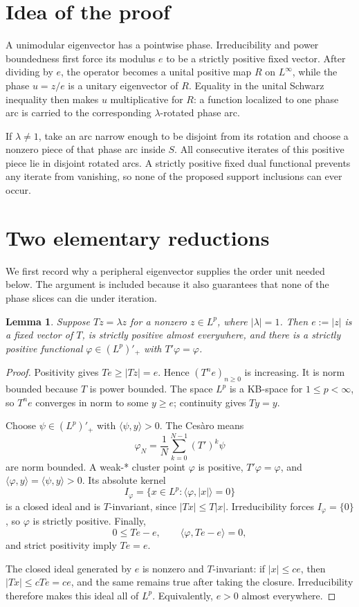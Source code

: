 \documentclass[11pt]{article}
\newtheorem{lemma}[theorem]{Lemma}
\begin{document}
\section{Idea of the proof}

A unimodular eigenvector has a pointwise phase.  Irreducibility and power
boundedness first force its modulus $e$ to be a strictly positive fixed
vector.  After dividing by $e$, the operator becomes a unital positive map
$R$ on $L^\infty$, while the phase $u=z/e$ is a unitary eigenvector of $R$.
Equality in the unital Schwarz inequality then makes $u$ multiplicative for
$R$: a function localized to one phase arc is carried to the corresponding
$\lambda$-rotated phase arc.

If $\lambda\ne1$, take an arc narrow enough to be disjoint from its rotation
and choose a nonzero piece of that phase arc inside $S$.  All consecutive
iterates of this positive piece lie in disjoint rotated arcs.  A strictly
positive fixed dual functional prevents any iterate from vanishing, so none
of the proposed support inclusions can ever occur.

\section{Two elementary reductions}

We first record why a peripheral eigenvector supplies the order unit needed
below.  The argument is included because it also guarantees that none of the
phase slices can die under iteration.

\begin{lemma}\label{lem:fixed-modulus}
Suppose $Tz=\lambda z$ for a nonzero $z\in L^p$, where
$|\lambda|=1$.  Then $e:=|z|$ is a fixed vector of $T$, is strictly positive
almost everywhere, and there is a strictly positive functional
$\varphi\in(L^p)'_+$ with $T'\varphi=\varphi$.
\end{lemma}

\begin{proof}
Positivity gives $Te\ge |Tz|=e$.  Hence $(T^ne)_{n\ge0}$ is increasing.
It is norm bounded because $T$ is power bounded.  The space $L^p$ is a
KB-space for $1\le p<\infty$, so $T^ne$ converges in norm to some $y\ge e$;
continuity gives $Ty=y$.

Choose $\psi\in(L^p)'_+$ with $\langle\psi,y\rangle>0$.  The Ces\`aro means
\[
 \varphi_N=\frac1N\sum_{k=0}^{N-1}(T')^k\psi
\]
are norm bounded.  A weak-* cluster point $\varphi$ is positive,
$T'\varphi=\varphi$, and
$\langle\varphi,y\rangle=\langle\psi,y\rangle>0$.  Its absolute kernel
\[
 I_\varphi=\{x\in L^p:\langle\varphi,|x|\rangle=0\}
\]
is a closed ideal and is $T$-invariant, since
$|Tx|\le T|x|$.  Irreducibility forces $I_\varphi=\{0\}$, so $\varphi$ is
strictly positive.  Finally,
\[
 0\le Te-e,
 \qquad
 \langle\varphi,Te-e\rangle=0,
\]
and strict positivity imply $Te=e$.

The closed ideal generated by $e$ is nonzero and $T$-invariant: if
$|x|\le ce$, then $|Tx|\le cTe=ce$, and the same remains true after taking
the closure.  Irreducibility therefore makes this ideal all of $L^p$.
Equivalently, $e>0$ almost everywhere.
\end{proof}
\end{document}

